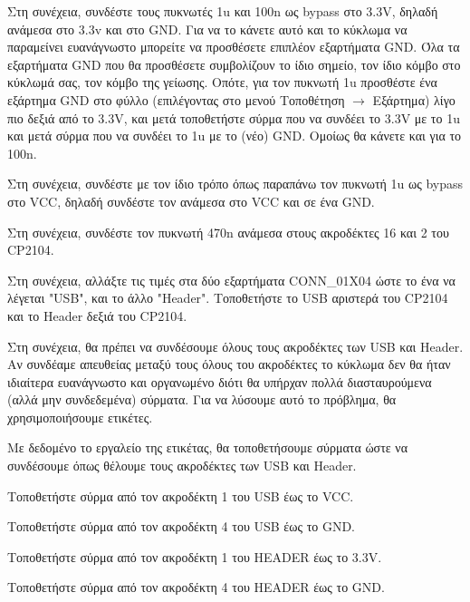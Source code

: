 \documentclass[a4paper]{article}
\begin{document}
Στη συνέχεια, συνδέστε τους πυκνωτές 1u και 100n ως bypass στο 3.3V, δηλαδή ανάμεσα στο 3.3v και στο GND. Για να το κάνετε αυτό και το κύκλωμα να παραμείνει ευανάγνωστο μπορείτε να προσθέσετε επιπλέον εξαρτήματα GND. Όλα τα εξαρτήματα GND που θα προσθέσετε συμβολίζουν το ίδιο σημείο, τον ίδιο κόμβο στο κύκλωμά σας, τον κόμβο της γείωσης. Οπότε, για τον πυκνωτή 1u προσθέστε ένα εξάρτημα GND στο φύλλο (επιλέγοντας στο μενού Τοποθέτηση $\rightarrow$ Εξάρτημα) λίγο πιο δεξιά από το 3.3V, και μετά τοποθετήστε σύρμα που να συνδέει το 3.3V με το 1u και μετά σύρμα που να συνδέει το 1u με το (νέο) GND. Ομοίως θα κάνετε και για το 100n.

Στη συνέχεια, συνδέστε με τον ίδιο τρόπο όπως παραπάνω τον πυκνωτή 1u ως bypass στο VCC, δηλαδή συνδέστε τον ανάμεσα στο VCC και σε ένα GND.

Στη συνέχεια, συνδέστε τον πυκνωτή 470n ανάμεσα στους ακροδέκτες 16 και 2 του \textenglish{CP2104}.

Στη συνέχεια, αλλάξτε τις τιμές στα δύο εξαρτήματα CONN\_01X04 ώστε το ένα να λέγεται "USB", και το άλλο "Header". Τοποθετήστε το USB αριστερά του \textenglish{CP2104} και το Header δεξιά του \textenglish{CP2104}.

\begin{figure}
  \begin{center}
    \label{fig:kicad-main}
  \end{center}
\end{figure}

Στη συνέχεια, θα πρέπει να συνδέσουμε όλους τους ακροδέκτες των USB και Header. Αν συνδέαμε απευθείας μεταξύ τους όλους του ακροδέκτες το κύκλωμα δεν θα ήταν ιδιαίτερα ευανάγνωστο και οργανωμένο διότι θα υπήρχαν πολλά διασταυρούμενα (αλλά μην συνδεδεμένα) σύρματα. Για να λύσουμε αυτό το πρόβλημα, θα χρησιμοποιήσουμε ετικέτες.

Με δεδομένο το εργαλείο της ετικέτας, θα τοποθετήσουμε σύρματα ώστε να συνδέσουμε όπως θέλουμε τους ακροδέκτες των USB και Header.

Τοποθετήστε σύρμα από τον ακροδέκτη 1 του USB έως το VCC.

Τοποθετήστε σύρμα από τον ακροδέκτη 4 του USB έως το GND.

Τοποθετήστε σύρμα από τον ακροδέκτη 1 του HEADER έως το 3.3V.

Τοποθετήστε σύρμα από τον ακροδέκτη 4 του HEADER έως το GND.
\end{document}
